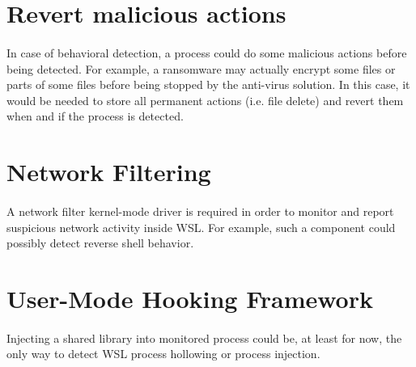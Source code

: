     \section{Revert malicious actions}
        \paragraph{}
        In case of behavioral detection, a process could do some malicious actions before being detected. For example, a ransomware may actually
        encrypt some files or parts of some files before being stopped by the anti-virus solution. In this case, it would be needed to store all
        permanent actions (i.e. file delete) and revert them when and if the process is detected.

    \section{Network Filtering}
        \paragraph{}
        A network filter kernel-mode driver is required in order to monitor and report suspicious network activity inside WSL. For example, such
        a component could possibly detect reverse shell behavior.

    \section{User-Mode Hooking Framework}
        \paragraph{}
        Injecting a shared library into monitored process could be, at least for now, the only way to detect WSL process hollowing or
        process injection.
